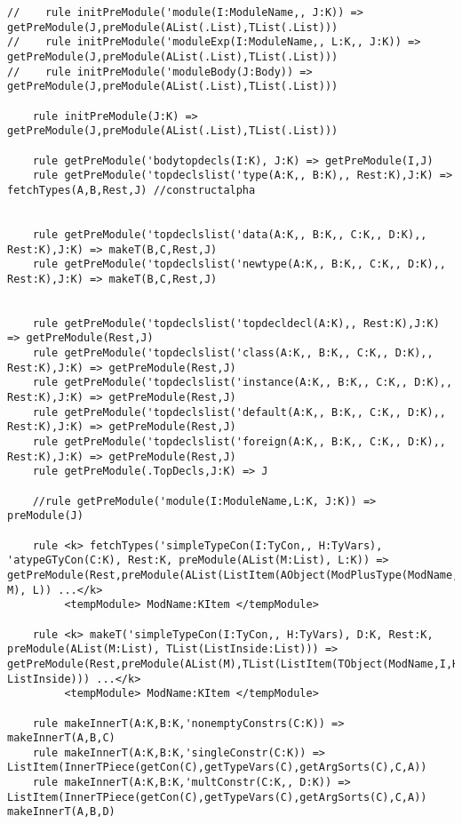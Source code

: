 \begin{lstlisting}
//    rule initPreModule('module(I:ModuleName,, J:K)) => getPreModule(J,preModule(AList(.List),TList(.List)))
//    rule initPreModule('moduleExp(I:ModuleName,, L:K,, J:K)) => getPreModule(J,preModule(AList(.List),TList(.List)))
//    rule initPreModule('moduleBody(J:Body)) => getPreModule(J,preModule(AList(.List),TList(.List)))

    rule initPreModule(J:K) => getPreModule(J,preModule(AList(.List),TList(.List)))

    rule getPreModule('bodytopdecls(I:K), J:K) => getPreModule(I,J)
    rule getPreModule('topdeclslist('type(A:K,, B:K),, Rest:K),J:K) => fetchTypes(A,B,Rest,J) //constructalpha


    rule getPreModule('topdeclslist('data(A:K,, B:K,, C:K,, D:K),, Rest:K),J:K) => makeT(B,C,Rest,J)
    rule getPreModule('topdeclslist('newtype(A:K,, B:K,, C:K,, D:K),, Rest:K),J:K) => makeT(B,C,Rest,J)


    rule getPreModule('topdeclslist('topdecldecl(A:K),, Rest:K),J:K) => getPreModule(Rest,J)
    rule getPreModule('topdeclslist('class(A:K,, B:K,, C:K,, D:K),, Rest:K),J:K) => getPreModule(Rest,J)
    rule getPreModule('topdeclslist('instance(A:K,, B:K,, C:K,, D:K),, Rest:K),J:K) => getPreModule(Rest,J)
    rule getPreModule('topdeclslist('default(A:K,, B:K,, C:K,, D:K),, Rest:K),J:K) => getPreModule(Rest,J)
    rule getPreModule('topdeclslist('foreign(A:K,, B:K,, C:K,, D:K),, Rest:K),J:K) => getPreModule(Rest,J)
    rule getPreModule(.TopDecls,J:K) => J

    //rule getPreModule('module(I:ModuleName,L:K, J:K)) => preModule(J)

    rule <k> fetchTypes('simpleTypeCon(I:TyCon,, H:TyVars), 'atypeGTyCon(C:K), Rest:K, preModule(AList(M:List), L:K)) => getPreModule(Rest,preModule(AList(ListItem(AObject(ModPlusType(ModName,I),C)) M), L)) ...</k>
         <tempModule> ModName:KItem </tempModule>

    rule <k> makeT('simpleTypeCon(I:TyCon,, H:TyVars), D:K, Rest:K, preModule(AList(M:List), TList(ListInside:List))) => getPreModule(Rest,preModule(AList(M),TList(ListItem(TObject(ModName,I,H,makeInnerT(I,H,D))) ListInside))) ...</k>
         <tempModule> ModName:KItem </tempModule>

    rule makeInnerT(A:K,B:K,'nonemptyConstrs(C:K)) => makeInnerT(A,B,C)
    rule makeInnerT(A:K,B:K,'singleConstr(C:K)) => ListItem(InnerTPiece(getCon(C),getTypeVars(C),getArgSorts(C),C,A))
    rule makeInnerT(A:K,B:K,'multConstr(C:K,, D:K)) => ListItem(InnerTPiece(getCon(C),getTypeVars(C),getArgSorts(C),C,A)) makeInnerT(A,B,D)


\end{lstlisting}
